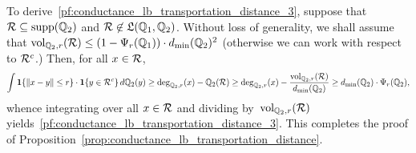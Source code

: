 	To derive~\eqref{pf:conductance_lb_transportation_distance_3}, suppose that $\mathcal{R} \subseteq \mathrm{supp}(\mathbb{Q}_2)$ and $\mathcal{R} \not\in \mathfrak{L}(\mathbb{Q}_1,\mathbb{Q}_2)$. Without loss of generality, we shall assume that $\mathrm{vol}_{\mathbb{Q}_2,r}(\mathcal{R}) \leq (1 - \Psi_r(\mathbb{Q}_1)) \cdot d_{\min}(\mathbb{Q}_2)^2$ (otherwise we can work with respect to $\mathcal{R}^c$.)  Then, for all $x \in \mathcal{R}$,
	\begin{equation*}
	\int \mathbf{1}\{\|x - y\| \leq r\}\cdot \mathbf{1}\{y \in \mathcal{R}^c\} \,d\mathbb{Q}_2(y) \geq \deg_{\mathbb{Q}_2,r}(x) -  \mathbb{Q}_2(\mathcal{R}) \geq \deg_{\mathbb{Q}_2,r}(x) - \frac{\mathrm{vol}_{\mathbb{Q}_2,r}(\mathcal{R})}{d_{\min}(\mathbb{Q}_2)} \geq d_{\min}(\mathbb{Q}_2) \cdot \Psi_{r}(\mathbb{Q}_2),
	\end{equation*}
	whence integrating over all $x \in \mathcal{R}$ and dividing by~$\mathrm{vol}_{\mathbb{Q}_2,r}(\mathcal{R})$ yields~\eqref{pf:conductance_lb_transportation_distance_3}. This completes the proof of Proposition~\ref{prop:conductance_lb_transportation_distance}. 

